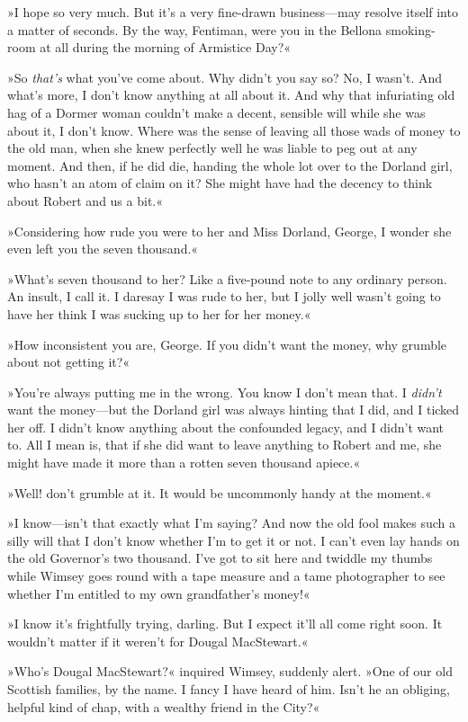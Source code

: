 »I hope so very much. But it's a very fine-drawn business—may resolve itself into a matter of seconds. By the way, Fentiman, were you in the Bellona smoking-room at all during the morning of Armistice Day?«

»So \textit{that's} what you've come about. Why didn't you say so? No, I wasn't. And what's more, I don't know anything at all about it. And why that infuriating old hag of a Dormer woman couldn't make a decent, sensible will while she was about it, I don't know. Where was the sense of leaving all those wads of money to the old man, when she knew perfectly well he was liable to peg out at any moment. And then, if he did die, handing the whole lot over to the Dorland girl, who hasn't an atom of claim on it? She might have had the decency to think about Robert and us a bit.«

»Considering how rude you were to her and Miss Dorland, George, I wonder she even left you the seven thousand.«

»What's seven thousand to her? Like a five-pound note to any ordinary person. An insult, I call it. I daresay I was rude to her, but I jolly well wasn't going to have her think I was sucking up to her for her money.«

»How inconsistent you are, George. If you didn't want the money, why grumble about not getting it?«

»You're always putting me in the wrong. You know I don't mean that. I \textit{didn't} want the money—but the Dorland girl was always hinting that I did, and I ticked her off. I didn't know anything about the confounded legacy, and I didn't want to. All I mean is, that if she did want to leave anything to Robert and me, she might have made it more than a rotten seven thousand apiece.«

»Well! don't grumble at it. It would be uncommonly handy at the moment.«

»I know—isn't that exactly what I'm saying? And now the old fool makes such a silly will that I don't know whether I'm to get it or not. I can't even lay hands on the old Governor's two thousand. I've got to sit here and twiddle my thumbs while Wimsey goes round with a tape measure and a tame photographer to see whether I'm entitled to my own grandfather's money!«

»I know it's frightfully trying, darling. But I expect it'll all come right soon. It wouldn't matter if it weren't for Dougal MacStewart.«

»Who's Dougal MacStewart?« inquired Wimsey, suddenly alert. »One of our old Scottish families, by the name. I fancy I have heard of him. Isn't he an obliging, helpful kind of chap, with a wealthy friend in the City?«

